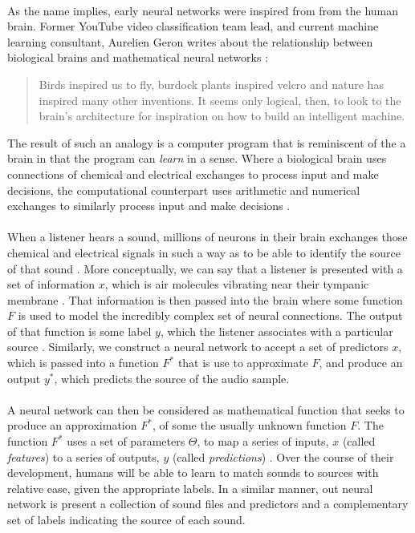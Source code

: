 \documentclass[12pt,letterpaper]{article}
\begin{document}
\paragraph*{}As the name implies, early neural networks were inspired from from the human brain. Former YouTube video classification team lead, and current machine learning consultant, Aurelien Geron writes about the relationship between biological brains and mathematical neural networks \cite{Geron}: 
\begin{quote}
Birds inspired us to fly, burdock plants inspired velcro and nature has inspired many other inventions. It seems only logical, then, to look to the brain's architecture for inspiration on how to build an intelligent machine.
\end{quote}
The result of such an analogy is a computer program that is reminiscent of the a brain in that the program can \textit{learn} in a sense. Where a biological brain uses connections of chemical and electrical exchanges to process input and make decisions, the computational counterpart uses arithmetic and numerical exchanges to similarly process input and make decisions \cite{Geron,Levine,Bishop}. 

\paragraph*{}When a listener hears a sound, millions of neurons in their brain exchanges those chemical and electrical signals in such a way as to be able to identify the source of that sound \cite{Geron,Virtanen}. More conceptually, we can say that a listener is presented with a set of information $x$, which is air molecules vibrating near their tympanic membrane \cite{White,Olson}. That information is then passed into the brain where some function $F$ is used to model the incredibly complex set of neural connections. The output of that function is some label $y$, which the listener associates with a particular source \cite{Olson}. Similarly, we construct a neural network to accept a set of predictors $x$, which is passed into a function $F^*$ that is use to approximate $F$, and produce an output $y^*$, which predicts the source of the audio sample.

\paragraph*{}A neural network can then be considered as mathematical function that seeks to produce an approximation $F^*$, of some the usually unknown function $F$. The function $F^*$ uses a set of parameters $\Theta$, to map a series of inputs, $x$ (called \textit{features}) to a series of outputs, $y$ (called \textit{predictions}) \cite{Goodfellow,James,Virtanen}. Over the course of their development, humans will be able to learn to match sounds to sources with relative ease, given the appropriate labels. In a similar manner, out neural network is present a collection of sound files and predictors and a complementary set of labels indicating the source of each sound.
\end{document}
